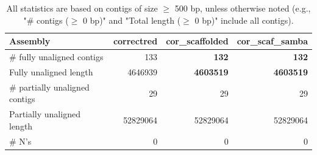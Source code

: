 \documentclass[12pt,a4paper]{article}
\begin{document}
\begin{table}[ht]
\begin{center}
\caption{All statistics are based on contigs of size $\geq$ 500 bp, unless otherwise noted (e.g., "\# contigs ($\geq$ 0 bp)" and "Total length ($\geq$ 0 bp)" include all contigs).}
\begin{tabular}{|l*{3}{|r}|}
\hline
Assembly & correctred & cor\_scaffolded & cor\_scaf\_samba \\ \hline
\# fully unaligned contigs & 133 & {\bf 132} & {\bf 132} \\ \hline
Fully unaligned length & 4646939 & {\bf 4603519} & {\bf 4603519} \\ \hline
\# partially unaligned contigs & 29 & 29 & 29 \\ \hline
Partially unaligned length & 52829064 & 52829064 & 52829064 \\ \hline
\# N's & 0 & 0 & 0 \\ \hline
\end{tabular}
\end{center}
\end{table}
\end{document}
